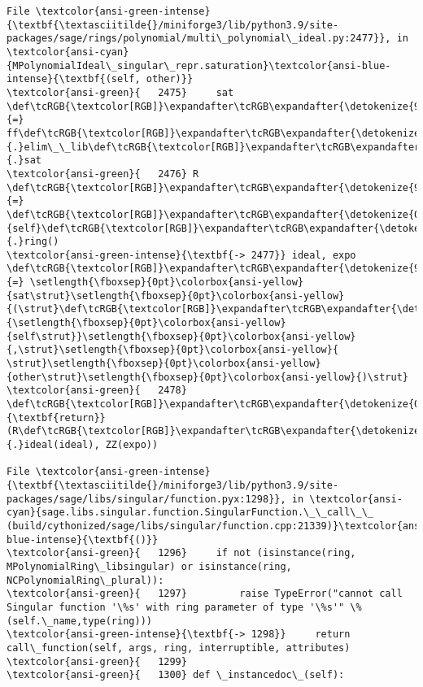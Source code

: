 \documentclass[11pt]{article}
\begin{document}
\begin{Verbatim}[commandchars=\\\{\}, frame=single, framerule=2mm, rulecolor=\color{outerrorbackground}]
File \textcolor{ansi-green-intense}{\textbf{\textasciitilde{}/miniforge3/lib/python3.9/site-packages/sage/rings/polynomial/multi\_polynomial\_ideal.py:2477}}, in \textcolor{ansi-cyan}{MPolynomialIdeal\_singular\_repr.saturation}\textcolor{ansi-blue-intense}{\textbf{(self, other)}}
\textcolor{ansi-green}{   2475}     sat \def\tcRGB{\textcolor[RGB]}\expandafter\tcRGB\expandafter{\detokenize{98,98,98}}{=} ff\def\tcRGB{\textcolor[RGB]}\expandafter\tcRGB\expandafter{\detokenize{98,98,98}}{.}elim\_\_lib\def\tcRGB{\textcolor[RGB]}\expandafter\tcRGB\expandafter{\detokenize{98,98,98}}{.}sat
\textcolor{ansi-green}{   2476} R \def\tcRGB{\textcolor[RGB]}\expandafter\tcRGB\expandafter{\detokenize{98,98,98}}{=} \def\tcRGB{\textcolor[RGB]}\expandafter\tcRGB\expandafter{\detokenize{0,135,0}}{self}\def\tcRGB{\textcolor[RGB]}\expandafter\tcRGB\expandafter{\detokenize{98,98,98}}{.}ring()
\textcolor{ansi-green-intense}{\textbf{-> 2477}} ideal, expo \def\tcRGB{\textcolor[RGB]}\expandafter\tcRGB\expandafter{\detokenize{98,98,98}}{=} \setlength{\fboxsep}{0pt}\colorbox{ansi-yellow}{sat\strut}\setlength{\fboxsep}{0pt}\colorbox{ansi-yellow}{(\strut}\def\tcRGB{\textcolor[RGB]}\expandafter\tcRGB\expandafter{\detokenize{0,135,0}}{\setlength{\fboxsep}{0pt}\colorbox{ansi-yellow}{self\strut}}\setlength{\fboxsep}{0pt}\colorbox{ansi-yellow}{,\strut}\setlength{\fboxsep}{0pt}\colorbox{ansi-yellow}{ \strut}\setlength{\fboxsep}{0pt}\colorbox{ansi-yellow}{other\strut}\setlength{\fboxsep}{0pt}\colorbox{ansi-yellow}{)\strut}
\textcolor{ansi-green}{   2478} \def\tcRGB{\textcolor[RGB]}\expandafter\tcRGB\expandafter{\detokenize{0,135,0}}{\textbf{return}} (R\def\tcRGB{\textcolor[RGB]}\expandafter\tcRGB\expandafter{\detokenize{98,98,98}}{.}ideal(ideal), ZZ(expo))

File \textcolor{ansi-green-intense}{\textbf{\textasciitilde{}/miniforge3/lib/python3.9/site-packages/sage/libs/singular/function.pyx:1298}}, in \textcolor{ansi-cyan}{sage.libs.singular.function.SingularFunction.\_\_call\_\_ (build/cythonized/sage/libs/singular/function.cpp:21339)}\textcolor{ansi-blue-intense}{\textbf{()}}
\textcolor{ansi-green}{   1296}     if not (isinstance(ring, MPolynomialRing\_libsingular) or isinstance(ring, NCPolynomialRing\_plural)):
\textcolor{ansi-green}{   1297}         raise TypeError("cannot call Singular function '\%s' with ring parameter of type '\%s'" \% (self.\_name,type(ring)))
\textcolor{ansi-green-intense}{\textbf{-> 1298}}     return call\_function(self, args, ring, interruptible, attributes)
\textcolor{ansi-green}{   1299} 
\textcolor{ansi-green}{   1300} def \_instancedoc\_(self):


\end{Verbatim}
\end{document}
